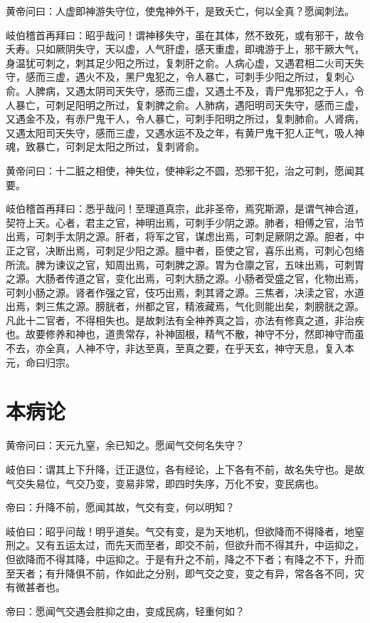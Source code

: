\documentclass{article}%
\begin{document}
黄帝问曰：人虚即神游失守位，使鬼神外干，是致夭亡，何以全真？愿闻刺法。

岐伯稽首再拜曰：昭乎哉问！谓神移失守，虽在其体，然不致死，或有邪干，故令夭寿。只如厥阴失守，天以虚，人气肝虚，感天重虚，即魂游于上，邪干厥大气，身温犹可刺之，刺其足少阳之所过，复刺肝之俞。人病心虚，又遇君相二火司天失守，感而三虚，遇火不及，黑尸鬼犯之，令人暴亡，可刺手少阳之所过，复刺心俞。人脾病，又遇太阴司天失守，感而三虚，又遇土不及，青尸鬼邪犯之于人，令人暴亡，可刺足阳明之所过，复刺脾之俞。人肺病，遇阳明司天失守，感而三虚，又遇金不及，有赤尸鬼干人，令人暴亡，可刺手阳明之所过，复刺肺俞。人肾病，又遇太阳司天失守，感而三虚，又遇水运不及之年，有黄尸鬼干犯人正气，吸人神魂，致暴亡，可刺足太阳之所过，复刺肾俞。

黄帝问曰：十二脏之相使，神失位，使神彩之不圆，恐邪干犯，治之可刺，愿闻其要。

岐伯稽首再拜曰：悉乎哉问！至理道真宗，此非圣帝，焉究斯源，是谓气神合道，契符上天。心者，君主之官，神明出焉，可刺手少阴之源。肺者，相傅之官，治节出焉，可刺手太阴之源。肝者，将军之官，谋虑出焉，可刺足厥阴之源。胆者，中正之官，决断出焉，可刺足少阳之源。膻中者，臣使之官，喜乐出焉，可刺心包络所流。脾为谏议之官，知周出焉，可刺脾之源。胃为仓廪之官，五味出焉，可刺胃之源。大肠者传道之官，变化出焉，可刺大肠之源。小肠者受盛之官，化物出焉，可刺小肠之源。肾者作强之官，伎巧出焉，刺其肾之源。三焦者，决渎之官，水道出焉，刺三焦之源。膀胱者，州都之官，精液藏焉，气化则能出矣，刺膀胱之源。凡此十二官者，不得相失也。是故刺法有全神养真之旨，亦法有修真之道，非治疾也。故要修养和神也，道贵常存，补神固根，精气不散，神守不分，然即神守而虽不去，亦全真，人神不守，非达至真，至真之要，在乎天玄，神守天息，复入本元，命曰归宗。
\section{本病论}
黄帝问曰：天元九窒，余已知之。愿闻气交何名失守？

岐伯曰：谓其上下升降，迁正退位，各有经论，上下各有不前，故名失守也。是故气交失易位，气交乃变，变易非常，即四时失序，万化不安，变民病也。

帝曰：升降不前，愿闻其故，气交有变，何以明知？

岐伯曰：昭乎问哉！明乎道矣。气交有变，是为天地机，但欲降而不得降者，地窒刑之。又有五运太过，而先天而至者，即交不前，但欲升而不得其升，中运抑之，但欲降而不得其降，中运抑之。于是有升之不前，降之不下者；有降之不下，升而至天者；有升降俱不前，作如此之分别，即气交之变，变之有异，常各各不同，灾有微甚者也。

帝曰：愿闻气交遇会胜抑之由，变成民病，轻重何如？
\end{document}
